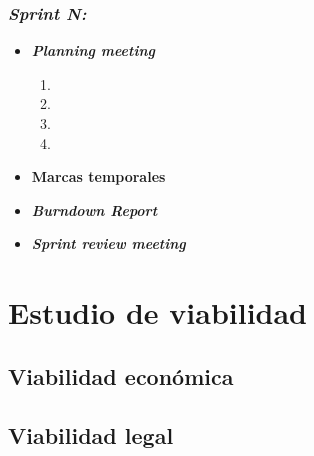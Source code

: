 \subsubsection{\textit{Sprint N: }}
\begin{itemize}
	\item \textbf{\textit{Planning meeting}}
	\begin{enumerate}
		\item
		\item
		\item
		\item 
	\end{enumerate}
	\item \textbf{Marcas temporales}		
	\item \textbf{\textit{Burndown Report}}
	\item \textbf{\textit{Sprint review meeting}}
\end{itemize}
\section{Estudio de viabilidad}

\subsection{Viabilidad económica}

\subsection{Viabilidad legal}


